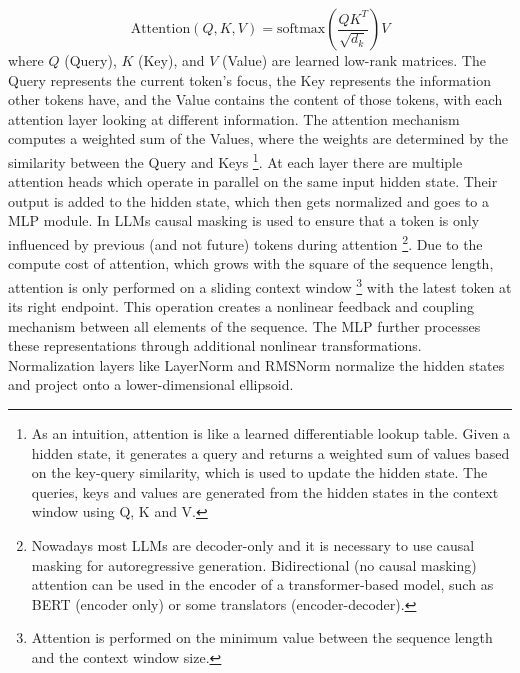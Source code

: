 \documentclass[a4paper,12pt]{article}
\begin{document}
\begin{equation}
    \text{Attention}(Q, K, V) = \text{softmax}\left(\frac{QK^T}{\sqrt{d_k}}\right)V
\end{equation}
where $Q$ (Query), $K$ (Key), and $V$ (Value) are learned low-rank matrices. The Query represents the current token's focus, the Key represents the information other tokens have, and the Value contains the content of those tokens, with each attention layer looking at different information. The attention mechanism computes a weighted sum of the Values, where the weights are determined by the similarity between the Query and Keys \footnote{As an intuition, attention is like a learned differentiable lookup table. Given a hidden state, it generates a query and returns a weighted sum of values based on the key-query similarity, which is used to update the hidden state. The queries, keys and values are generated from the hidden states in the context window using Q, K and V.}. At each layer there are multiple attention heads which operate in parallel on the same input hidden state. Their output is added to the hidden state, which then gets normalized and goes to a MLP module.
In LLMs causal masking is used to ensure that a token is only influenced by previous (and not future) tokens during attention 
\footnote{Nowadays most LLMs are decoder-only and it is necessary to use causal masking for autoregressive generation. Bidirectional (no causal masking) attention can be used in the encoder of a transformer-based model, such as BERT (encoder only) or some translators (encoder-decoder).}.
Due to the compute cost of attention, which grows with the square of the sequence length, attention is only performed on a sliding context window \footnote{Attention is performed on the minimum value between the sequence length and the context window size.} with the latest token at its right endpoint.
This operation creates a nonlinear feedback and coupling mechanism between all elements of the sequence. The MLP further processes these representations through additional nonlinear transformations. Normalization layers like LayerNorm and RMSNorm normalize the hidden states and project onto a lower-dimensional ellipsoid.
\end{document}
